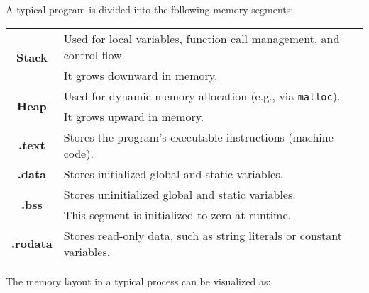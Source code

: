 A typical program is divided into the following memory segments:

\begin{table}[h]
	\centering
	\begin{tabular}{|c|l|}
		\hline
		\multirow{2}{*}{\textbf{Stack}} & Used for local variables, function call management, and control flow. \\
		& It grows downward in memory. \\ \hline
		\multirow{2}{*}{\textbf{Heap}} & Used for dynamic memory allocation (e.g., via \texttt{malloc}). \\ & It grows upward in memory. \\ \hline
		\textbf{.text} & Stores the program's executable instructions (machine code). \\ \hline
		\textbf{.data} & Stores initialized global and static variables. \\ \hline
		\multirow{2}{*}{\textbf{.bss}} & Stores uninitialized global and static variables. \\
		& This segment is initialized to zero at runtime. \\ \hline
		\textbf{.rodata} & Stores read-only data, such as string literals or constant variables. \\ \hline
	\end{tabular}
\end{table}

\noindent The memory layout in a typical process can be visualized as:

